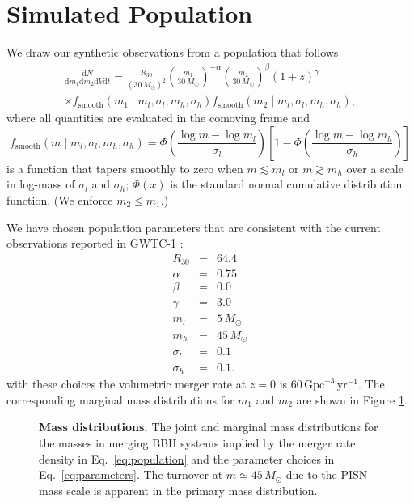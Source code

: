 \documentclass[modern]{aastex62}
\newcommand{\dd}{\mathrm{d}}
\newcommand{\diff}[2]{\frac{\dd #1}{\dd #2}}
\newcommand{\fsm}{f_{\mathrm{smooth}}}
\newcommand{\MPISN}{45 \, \MSun{}}
\newcommand{\MSun}{M_\odot}
\newcommand{\perGpcyr}{\mathrm{Gpc}^{-3} \, \mathrm{yr}^{-1}}
\begin{document}


\appendix

\setcounter{figure}{0}
\renewcommand{\figurename}{Extended Data Figure}
\renewcommand{\tablename}{Extended Data Table}

\section{Simulated Population}
\label{sec:simulated-population}

We draw our synthetic observations from a population that follows
%
\begin{multline}
  \label{eq:population}
  \diff{N}{m_1 \dd m_2 \dd V \dd t} = \frac{R_{30}}{\left( 30 \, \MSun \right)^2} \left( \frac{m_1}{30 \, \MSun} \right)^{-\alpha} \left( \frac{m_2}{30 \, \MSun} \right)^{\beta} \left( 1 + z \right)^{\gamma} \\ \times \fsm\left( m_1 \mid m_l, \sigma_l, m_h, \sigma_h \right) \fsm\left( m_2 \mid m_l, \sigma_l, m_h, \sigma_h \right),
\end{multline}
%
where all quantities are evaluated in the comoving frame and
%
\begin{equation}
  \label{eq:smooth}
  \fsm\left( m \mid m_l, \sigma_l, m_h, \sigma_h \right) = \Phi\left( \frac{\log m - \log m_l}{\sigma_l} \right) \left[ 1 - \Phi\left( \frac{\log m - \log m_h}{\sigma_h} \right) \right]
\end{equation}
%
is a function that tapers smoothly to zero when $m \lesssim m_l$ or $m \gtrsim
m_h$ over a scale in log-mass of $\sigma_l$ and $\sigma_h$; $\Phi(x)$ is the
standard normal cumulative distribution function.  (We enforce $m_2 \leq m_1$.)

We have chosen population parameters that are consistent with the current
observations reported in GWTC-1 \citep{GWTC-1,O1O2Population}:
%
\begin{eqnarray}
  \label{eq:parameters}
  R_{30} & = & 64.4 \\
  \alpha & = & 0.75 \\
  \beta & = & 0.0 \\
  \gamma & = & 3.0 \\
  m_l & = & 5 \, \MSun \\
  m_h & = & 45 \, \MSun \\
  \sigma_l & = & 0.1 \\
  \sigma_h & = & 0.1.
\end{eqnarray}
%
with these choices the volumetric merger rate at $z = 0$ is $60 \, \perGpcyr$.
The corresponding marginal mass distributions for $m_1$ and $m_2$ are shown in
Figure \ref{fig:marginal-masses}.

\begin{figure}
%
  \caption{\label{fig:marginal-masses} \textbf{Mass distributions.} The joint
  and  marginal mass distributions for the masses in merging \ac{BBH} systems
  implied by the merger rate density in Eq.\ \eqref{eq:population} and the
  parameter choices in Eq.\ \eqref{eq:parameters}. The turnover at $m \simeq
  \MPISN{}$ due to the \ac{PISN} mass scale is apparent in the primary mass
  distribution.}
%
\end{figure}
\end{document}
